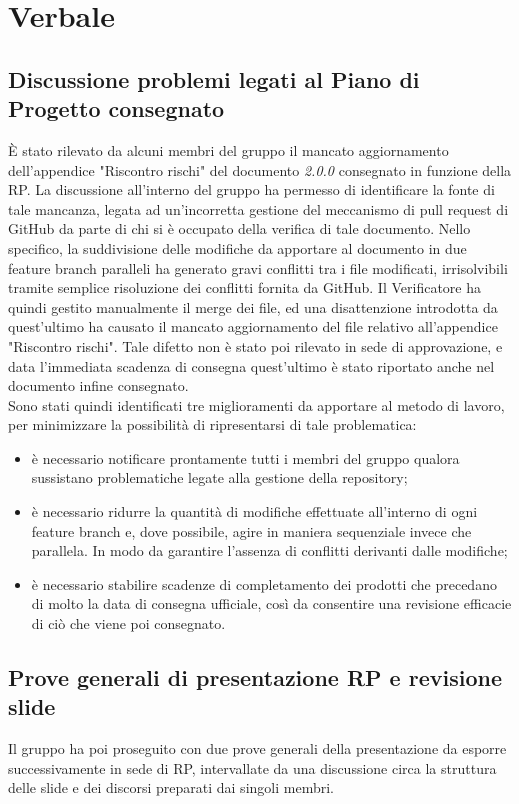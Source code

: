 \section{Verbale}

	\subsection{Discussione problemi legati al Piano di Progetto consegnato}
		È stato rilevato da alcuni membri del gruppo il mancato aggiornamento dell'appendice "Riscontro rischi" del documento \PdP{} \textit{2.0.0} consegnato in funzione della RP.
		La discussione all'interno del gruppo ha permesso di identificare la fonte di tale mancanza, legata ad un'incorretta gestione del meccanismo di pull request di GitHub da parte di chi si è occupato della verifica di tale documento.
		Nello specifico, la suddivisione delle modifiche da apportare al documento in due feature branch paralleli ha generato gravi conflitti tra i file modificati, irrisolvibili tramite semplice risoluzione dei conflitti fornita da GitHub.
		Il Verificatore ha quindi gestito manualmente il merge dei file, ed una disattenzione introdotta da quest'ultimo ha causato il mancato aggiornamento del file relativo all'appendice "Riscontro rischi". Tale difetto non è stato poi rilevato in sede di approvazione, e data l'immediata scadenza di consegna quest'ultimo è stato riportato anche nel documento infine consegnato. \\
		Sono stati quindi identificati tre miglioramenti da apportare al metodo di lavoro, per minimizzare la possibilità di ripresentarsi di tale problematica:
		\begin{itemize}
			\item è necessario notificare prontamente tutti i membri del gruppo qualora sussistano problematiche legate alla gestione della repository;
			\item è necessario ridurre la quantità di modifiche effettuate all'interno di ogni feature branch e, dove possibile, agire in maniera sequenziale invece che parallela. In modo da garantire l'assenza di conflitti derivanti dalle modifiche;
			\item è necessario stabilire scadenze di completamento dei prodotti che precedano di molto la data di consegna ufficiale, così da consentire una revisione efficacie di ciò che viene poi consegnato.
		\end{itemize}
	
	\subsection{Prove generali di presentazione RP e revisione slide}
		Il gruppo ha poi proseguito con due prove generali della presentazione da esporre successivamente in sede di RP, intervallate da una discussione circa la struttura delle slide e dei discorsi preparati dai singoli membri.
		
